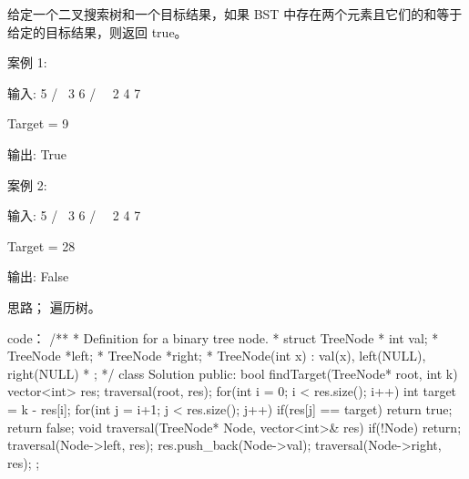 给定一个二叉搜索树和一个目标结果，如果 BST 中存在两个元素且它们的和等于给定的目标结果，则返回 true。

案例 1:

输入: 
    5
   / \
  3   6
 / \   \
2   4   7

Target = 9

输出: True

 

案例 2:

输入: 
    5
   / \
  3   6
 / \   \
2   4   7

Target = 28

输出: False























思路；
遍历树。


























code：
/**
 * Definition for a binary tree node.
 * struct TreeNode {
 *     int val;
 *     TreeNode *left;
 *     TreeNode *right;
 *     TreeNode(int x) : val(x), left(NULL), right(NULL) {}
 * };
 */
class Solution {
public:
    bool findTarget(TreeNode* root, int k) {
        vector<int> res;
        traversal(root, res);
        for(int i = 0; i < res.size(); i++)
        {
            int target = k - res[i];
            for(int j = i+1; j < res.size(); j++)
            {
                if(res[j] == target) return true;
            }
        }
        return false;
    }
    void traversal(TreeNode* Node, vector<int>& res)
    {
        if(!Node) return;
        traversal(Node->left, res);
        res.push_back(Node->val);
        traversal(Node->right, res);
    }
};